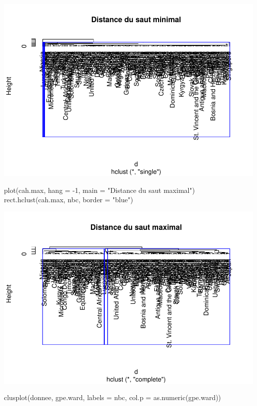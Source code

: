 \documentclass[
]{article}
\newenvironment{Shaded}{}{}
\newcommand{\AttributeTok}[1]{#1}
\newcommand{\DecValTok}[1]{#1}
\newcommand{\FunctionTok}[1]{#1}
\newcommand{\NormalTok}[1]{#1}
\newcommand{\SpecialCharTok}[1]{\textcolor[rgb]{0.00,0.50,0.50}{#1}}
\newcommand{\StringTok}[1]{\textcolor[rgb]{0.00,0.50,0.50}{#1}}
\begin{document}
\includegraphics{Projet_files/figure-latex/unnamed-chunk-20-1.pdf}

\begin{Shaded}
\begin{Highlighting}[]
\FunctionTok{plot}\NormalTok{(cah.max, }\AttributeTok{hang =} \SpecialCharTok{{-}}\DecValTok{1}\NormalTok{, }\AttributeTok{main =} \StringTok{"Distance du saut maximal"}\NormalTok{)}
\FunctionTok{rect.hclust}\NormalTok{(cah.max, nbc, }\AttributeTok{border =} \StringTok{"blue"}\NormalTok{)}
\end{Highlighting}
\end{Shaded}

\includegraphics{Projet_files/figure-latex/unnamed-chunk-21-1.pdf}

\begin{Shaded}
\begin{Highlighting}[]
\FunctionTok{clusplot}\NormalTok{(donnee, gpe.ward, }\AttributeTok{labels =}\NormalTok{ nbc, }\AttributeTok{col.p =} \FunctionTok{as.numeric}\NormalTok{(gpe.ward))}
\end{Highlighting}
\end{Shaded}
\end{document}
